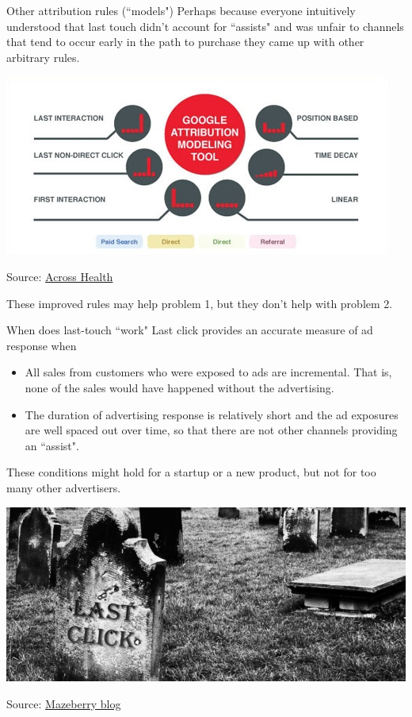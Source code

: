 \documentclass[10pt, aspectratio=169]{beamer}
\newcommand{\source}[1]{\begin{flushright} \footnotesize Source: {#1} \end{flushright} \normalsize}
\begin{document}
\begin{frame}{Other attribution rules (``models")}
Perhaps because everyone intuitively understood that last touch didn't account for ``assists" and was unfair to channels that tend to occur early in the path to purchase they came up with other arbitrary rules. \\
\begin{center}
\includegraphics[height=0.4\textheight]{images/google-attribution-modeling-tool.jpg} 
\end{center}
\source{\href{http://www.a-cross.com/health/node/516}{Across Health}}
\pause
\alert{These improved rules may help problem 1, but they don't help with problem 2.}  \\
\end{frame}

\begin{frame}{When does last-touch ``work"}
Last click provides an accurate measure of ad response when
\begin{itemize}
\item All sales from customers who were exposed to ads are \alert{incremental}. That is, none of the sales would have happened without the advertising. 
\item The duration of advertising response is relatively short and the ad exposures are well spaced out over time, so that there are not other channels providing an ``assist".
\end{itemize}
These conditions might hold for a startup or a new product, but not for too many other advertisers.
\end{frame}

\begin{frame}{}
\begin{center}
\includegraphics[height=0.7\textheight]{images/lastclickdead.png}
\end{center}
\source{\href{https://www.mazeberry.com/en/blog-why-is-last-click-dead/}{Mazeberry blog}}
\end{frame}
\end{document}
